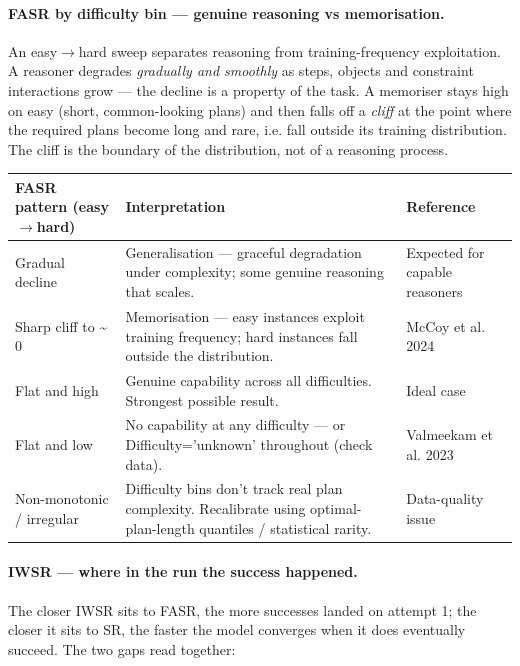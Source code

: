 \paragraph{FASR by difficulty bin --- genuine reasoning vs memorisation.}

An easy\(\rightarrow\)hard sweep separates reasoning from training-frequency exploitation. A reasoner degrades \emph{gradually and smoothly} as steps, objects and constraint interactions grow --- the decline is a property of the task. A memoriser stays high on easy (short, common-looking plans) and then falls off a \emph{cliff} at the point where the required plans become long and rare, i.e. fall outside its training distribution. The cliff is the boundary of the distribution, not of a reasoning process.

\begin{table}[h]\small
\centering
\begin{tabularx}{\linewidth}{@{}Y I P@{}}
\toprule
FASR pattern (easy\(\rightarrow\)hard) & Interpretation & Reference\\
\midrule
Gradual decline & Generalisation --- graceful degradation under complexity; some genuine reasoning that scales. & Expected for capable reasoners\\
\addlinespace
Sharp cliff to \textasciitilde{} 0 & Memorisation --- easy instances exploit training frequency; hard instances fall outside the distribution. & McCoy et al. 2024\\
\addlinespace
Flat and high & Genuine capability across all difficulties. Strongest possible result. & Ideal case\\
\addlinespace
Flat and low & No capability at any difficulty --- or Difficulty='unknown' throughout (check data). & Valmeekam et al. 2023\\
\addlinespace
Non-monotonic / irregular & Difficulty bins don't track real plan complexity. Recalibrate using optimal-plan-length quantiles / statistical rarity. & Data-quality issue\\
\bottomrule
\end{tabularx}
\end{table}

\paragraph{IWSR --- where in the run the success happened.}

The closer IWSR sits to FASR, the more successes landed on attempt 1; the closer it sits to SR, the faster the model converges when it does eventually succeed. The two gaps read together:

